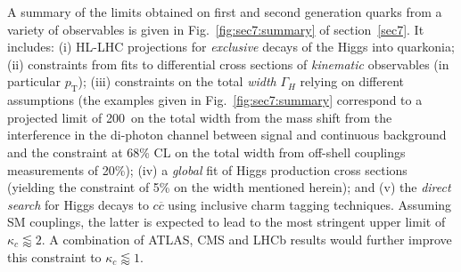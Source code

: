 \documentclass[../report.tex]{subfiles}
\begin{document}
A summary of the limits obtained on  first and second generation quarks from a variety of observables is given in Fig.~\ref{fig:sec7:summary} of section~\ref{sec7}. It includes: (i) HL-LHC projections for {\it exclusive} decays of the Higgs into quarkonia; (ii) constraints from fits to differential cross sections of {\it kinematic} observables (in particular $p_\mathrm{T}$); (iii) constraints on the total {\it width} $\Gamma_H$ relying on different assumptions (the examples given in  Fig.~\ref{fig:sec7:summary} correspond to a projected limit of 200~\UMeV on the total width from the mass shift from the interference in the di-photon channel between signal and continuous background and the constraint at 68\% CL on the total width from off-shell couplings measurements of 20\%); (iv) a {\it global} fit of Higgs production cross sections (yielding the constraint of 5\% on the width mentioned herein); and (v) the {\it direct search} for Higgs decays to $c\overline{c}$ using inclusive charm tagging techniques. Assuming SM couplings, the latter is expected to lead to the most stringent upper limit of $\kappa_c \lessapprox 2$. A combination of ATLAS, CMS and LHCb results would further improve this constraint to $\kappa_c \lessapprox 1$.


\end{document}
